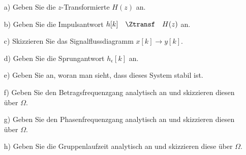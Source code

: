 \begin{itemize}
\setlength\itemsep{-0.25em}
\item[a)] Geben Sie die $z$-Transformierte $H(z)$ an.
\item[b)] Geben Sie die Impulsantwort $h[k] \quad\Ztransf\quad H(z)$ an.
\item[c)] Skizzieren Sie das Signalflussdiagramm $x[k] \rightarrow y[k]$.
\item[d)] Geben Sie die Sprungantwort $h_\epsilon[k]$ an.
\item[e)] Geben Sie an, woran man sieht, dass dieses System stabil ist.
\item[f)] Geben Sie den Betragsfrequenzgang analytisch an und skizzieren diesen über $\Omega$.
\item[g)] Geben Sie den Phasenfrequenzgang analytisch an und skizzieren diesen über $\Omega$.
\item[h)] Geben Sie die Gruppenlaufzeit analytisch an und skizzieren diese über $\Omega$.
\end{itemize}

